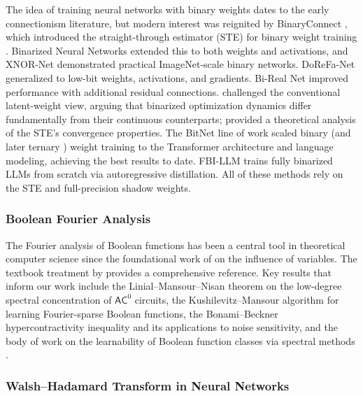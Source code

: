 \documentclass[12pt,a4paper]{article}
\theoremstyle{plain}
\theoremstyle{definition}
\theoremstyle{remark}
\begin{document}
The idea of training neural networks with binary weights dates to the early connectionism literature, but modern interest was reignited by BinaryConnect \citep{courbariaux2015binaryconnect}, which introduced the straight-through estimator (STE) for binary weight training \citep{bengio2013estimating}. Binarized Neural Networks \citep{hubara2016binarized} extended this to both weights and activations, and XNOR-Net \citep{rastegari2016xnor} demonstrated practical ImageNet-scale binary networks. DoReFa-Net \citep{zhou2016dorefa} generalized to low-bit weights, activations, and gradients. Bi-Real Net \citep{liu2018bireal} improved performance with additional residual connections. \citet{helwegen2019latent} challenged the conventional latent-weight view, arguing that binarized optimization dynamics differ fundamentally from their continuous counterparts; \citet{yin2019understanding} provided a theoretical analysis of the STE's convergence properties. The BitNet line of work \citep{wang2023bitnet} scaled binary (and later ternary \citep{ma2024era}) weight training to the Transformer architecture and language modeling, achieving the best results to date. FBI-LLM \citep{ma2024fbi} trains fully binarized LLMs from scratch via autoregressive distillation. All of these methods rely on the STE and full-precision shadow weights.

\subsubsection{Boolean Fourier Analysis}

The Fourier analysis of Boolean functions has been a central tool in theoretical computer science since the foundational work of \citet{kahn1988influence} on the influence of variables. The textbook treatment by \citet{odonnell2014analysis} provides a comprehensive reference. Key results that inform our work include the Linial--Mansour--Nisan theorem \citep{linial1989constant} on the low-degree spectral concentration of $\mathsf{AC}^0$ circuits, the Kushilevitz--Mansour algorithm \citep{kushilevitz1991learning} for learning Fourier-sparse Boolean functions, the Bonami--Beckner hypercontractivity inequality \citep{bonami1970etude, beckner1975inequalities} and its applications to noise sensitivity, and the body of work on the learnability of Boolean function classes via spectral methods \citep{mansour1994learning}.

\subsubsection{Walsh--Hadamard Transform in Neural Networks}
\end{document}
